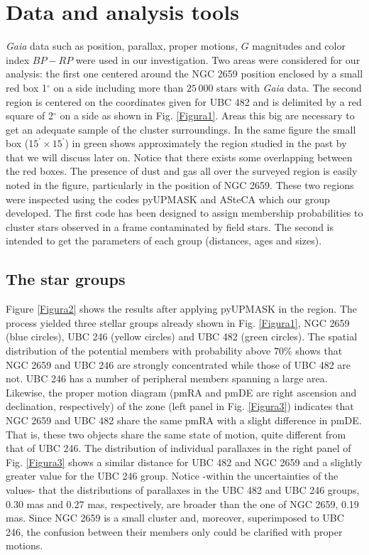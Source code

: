 \documentclass[baaa]{baaa}
\begin{document}
\section{Data and analysis tools}

\textit{Gaia} data such as position, parallax, proper motions, $G$ magnitudes and color index $BP-RP$ were used in our investigation. Two areas were considered for our analysis: the first one centered around the NGC 2659 position enclosed by a small red box 1$^{\circ}$ on a side including more than $25\,000$ stars with \textit{Gaia} data. The second region is centered on the coordinates given for UBC 482 and is delimited by a red square of 2$^{\circ}$ on a side as shown in Fig. \ref{Figura1}. Areas this big are necessary to get an adequate sample of the cluster surroundings.  In the same figure the small box (1$5^{\prime}\times15^{\prime}$) in green shows approximately the region studied in the past by \cite{Corti2007A&A...467..137C} that we will discuss later on. Notice that there exists some overlapping between the red boxes. The presence of dust and gas all over the surveyed region is easily noted in the figure, particularly in the position of NGC 2659. These two regions were inspected using the codes pyUPMASK \citep{Pera2021A&A...650A.109P} and ASteCA \citep{Perren2015A&A...576A...6P} which our group developed. The first code has been designed to assign membership probabilities to cluster stars observed in a frame contaminated by field stars. The second is intended to get the parameters of each group (distances, ages and sizes).

\subsection{The star groups}

Figure \ref{Figura2} shows the results after applying pyUPMASK in the region. The process yielded three stellar groups already shown in Fig. \ref{Figura1}, NGC 2659 (blue circles), UBC 246 (yellow circles) and UBC 482 (green circles). The spatial distribution of the potential members with probability above $70\%$ shows that NGC 2659 and UBC 246 are strongly concentrated while those of UBC 482 are not. UBC 246 has a number of peripheral members spanning a large area. Likewise, the proper motion diagram (pmRA and pmDE are right ascension and declination, respectively) of the zone (left panel in Fig. \ref{Figura3}) indicates that NGC 2659 and UBC 482 share the same pmRA with a slight difference in pmDE. That is, these two objects share the same state of motion, quite different from that of UBC 246. The distribution of individual parallaxes in the right panel of Fig. \ref{Figura3} shows a similar distance for UBC 482 and NGC 2659 and a slightly greater value for the UBC 246 group. Notice -within the uncertainties of the values- that the distributions of parallaxes in the UBC 482 and UBC 246 groups, 0.30 mas and 0.27 mas, respectively, are broader than the one of NGC 2659, 0.19 mas. Since NGC 2659 is a small cluster and, moreover, superimposed to UBC 246, the confusion between their members only could be clarified with proper motions.
 
\end{document}
